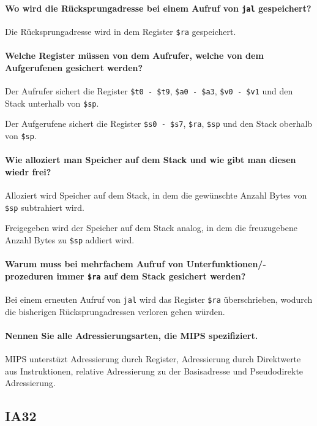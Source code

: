 \paragraph{Wo wird die Rücksprungadresse bei einem Aufruf von \texttt{jal} gespeichert?}
Die Rücksprungadresse wird in dem Register \texttt{\$ra} gespeichert.

\paragraph{Welche Register müssen von dem Aufrufer, welche von dem Aufgerufenen gesichert werden?}
Der Aufrufer sichert die Register \texttt{\$t0 - \$t9}, \texttt{\$a0 - \$a3}, \texttt{\$v0 - \$v1} und den Stack unterhalb von \texttt{\$sp}.

Der Aufgerufene sichert die Register \texttt{\$s0 - \$s7}, \texttt{\$ra}, \texttt{\$sp} und den Stack oberhalb von \texttt{\$sp}.

\paragraph{Wie alloziert man Speicher auf dem Stack und wie gibt man diesen wiedr frei?}
Alloziert wird Speicher auf dem Stack, in dem die gewünschte Anzahl Bytes von \texttt{\$sp} subtrahiert wird.

Freigegeben wird der Speicher auf dem Stack analog, in dem die freuzugebene Anzahl Bytes zu \texttt{\$sp} addiert wird.

\paragraph{Warum muss bei mehrfachem Aufruf von Unterfunktionen/-prozeduren immer \texttt{\$ra} auf dem Stack gesichert werden?}
Bei einem erneuten Aufruf von \texttt{jal} wird das Register \texttt{\$ra} überschrieben, wodurch die bisherigen Rücksprungadressen verloren gehen würden.

\paragraph{Nennen Sie alle Adressierungsarten, die MIPS spezifiziert.}
	MIPS unterstüzt Adressierung durch Register, Adressierung durch Direktwerte aus Instruktionen, relative Adressierung zu der Basisadresse und Pseudodirekte Adressierung.

\subsection{IA32}
